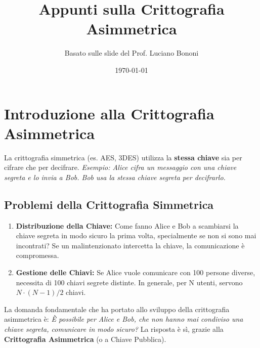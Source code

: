 \documentclass{article}
\title{\textbf{Appunti sulla Crittografia Asimmetrica}}
\author{Basato sulle slide del Prof. Luciano Bononi}
\date{\today}
\begin{document}
\maketitle
\tableofcontents
\newpage

\section{Introduzione alla Crittografia Asimmetrica}
La crittografia simmetrica (es. AES, 3DES) utilizza la \textbf{stessa chiave} sia per cifrare che per decifrare.
\textit{Esempio: Alice cifra un messaggio con una chiave segreta e lo invia a Bob. Bob usa la stessa chiave segreta per decifrarlo.}

\subsection{Problemi della Crittografia Simmetrica}
\begin{enumerate}[label=\arabic*.]
    \item \textbf{Distribuzione della Chiave:} Come fanno Alice e Bob a scambiarsi la chiave segreta in modo sicuro la prima volta, specialmente se non si sono mai incontrati? Se un malintenzionato intercetta la chiave, la comunicazione è compromessa.
    \item \textbf{Gestione delle Chiavi:} Se Alice vuole comunicare con 100 persone diverse, necessita di 100 chiavi segrete distinte. In generale, per N utenti, servono $N \cdot (N-1)/2$ chiavi.
\end{enumerate}

La domanda fondamentale che ha portato allo sviluppo della crittografia asimmetrica è: \textit{È possibile per Alice e Bob, che non hanno mai condiviso una chiave segreta, comunicare in modo sicuro?}
La risposta è sì, grazie alla \textbf{Crittografia Asimmetrica} (o a Chiave Pubblica).
\end{document}
